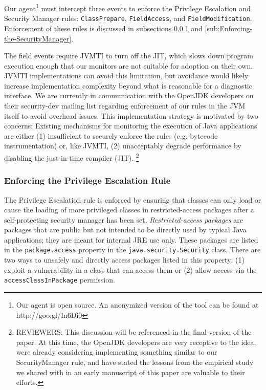 \documentclass{sig-alternate}
\begin{document}
Our agent\footnote{Our agent is open source. An anonymized version
of the tool can be found at http://goo.gl/In6Di0} must intercept three events to enforce the Privilege Escalation
and Security Manager rules: \texttt{ClassPrepare}, \texttt{FieldAccess},
and \texttt{FieldModification}. Enforcement of these rules is discussed in subsections \ref{sub:Enforcing-the-Privilege} and \ref{sub:Enforcing-the-SecurityManager}.

The field events require JVMTI to turn off the JIT, which slows down program
execution enough that our monitors are not suitable for adoption on their
own. JVMTI implementations can avoid this limitation, but avoidance would likely
increase implementation complexity beyond what is reasonable for a diagnostic
interface. We are currently in communication with the OpenJDK developers on
their security-dev mailing list regarding enforcement of our rules in the JVM
itself to avoid overhead issues. This implementation strategy is motivated by
two concerns: Existing mechanisms for monitoring the execution of Java
applications are either (1) insufficient to securely enforce the rules
(e.g. bytecode instrumentation) or, like JVMTI, (2) unacceptably degrade
performance by disabling the just-in-time compiler (JIT).%
\footnote{REVIEWERS: This discussion will be referenced in the final version of the paper. At this time, the OpenJDK developers are very receptive to the idea, were already considering implementing something similar to our SecurityManager rule, and have stated the lessons from the empirical study we shared with in an early manuscript of this paper are valuable to their efforts.}

\subsubsection{Enforcing the Privilege Escalation Rule}\label{sub:Enforcing-the-Privilege}

The Privilege Escalation rule is enforced by ensuring that classes
can only load or cause the loading of more privileged classes in restricted-access
packages after a self-protecting security manager has been set. \textit{Restricted-access
packages} are packages that are public but not intended to be directly
used by typical Java applications; they are meant for internal JRE
use only. These packages are listed in the \texttt{package.access}
property in the \texttt{java.security.Security} class. There are two
ways to unsafely and directly access packages listed in this property:
(1) exploit a vulnerability in a class that can access them or (2)
allow access via the \texttt{accessClassInPackage} permission.
\end{document}
